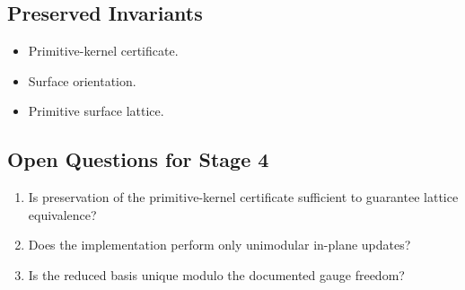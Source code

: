 \subsection{Preserved Invariants}

\begin{itemize}
\item Primitive-kernel certificate.
\item Surface orientation.
\item Primitive surface lattice.
\end{itemize}

\subsection{Open Questions for Stage 4}

\begin{enumerate}
\item Is preservation of the primitive-kernel certificate sufficient to
guarantee lattice equivalence?
\item Does the implementation perform only unimodular in-plane updates?
\item Is the reduced basis unique modulo the documented gauge freedom?
\end{enumerate}
